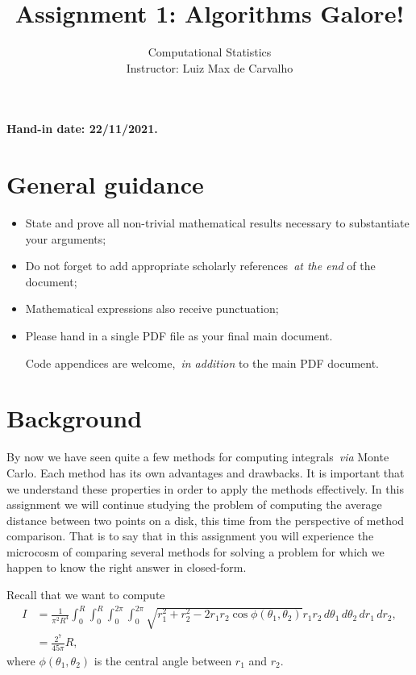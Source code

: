 \documentclass[a4paper,10pt, notitlepage]{report}
\title{Assignment 1: Algorithms Galore!}
\author{Computational Statistics \\ Instructor: Luiz Max de Carvalho}
\begin{document}
\maketitle

\textbf{Hand-in date: 22/11/2021.}

\section*{General guidance}
\begin{itemize}
 \item State and prove all non-trivial mathematical results necessary to substantiate your arguments;
 \item Do not forget to add appropriate scholarly references~\textit{at the end} of the document;
 \item Mathematical expressions also receive punctuation;
 \item Please hand in a single PDF file as your final main document.
 
 Code appendices are welcome,~\textit{in addition} to the main PDF document.
 \end{itemize}

\newpage

\section*{Background}

By now we have seen quite a few methods for computing integrals~\textit{via} Monte Carlo.
Each method has its own advantages and drawbacks.
It is important that we understand these properties in order to apply the methods effectively. 
In this assignment we will continue studying the problem of computing the average distance between two points on a disk, this time from the perspective of method comparison.
That is to say that in this assignment you will experience the microcosm of comparing several methods for solving a problem for which we happen to know the right answer in closed-form.

Recall that we want to compute 
 \begin{align*}
  I &= \frac{1}{\pi^2 R^4}\int_{0}^{R}\int_{0}^{R}\int_{0}^{2\pi}\int_{0}^{2\pi}\sqrt{r_1^2 + r_2^2 - 2r_1r_2\cos\phi(\theta_1, \theta_2)}r_1r_2\,d\theta_1\,d\theta_2\,dr_1\,dr_2,\\
  &= \frac{2^7}{45\pi}R,
 \end{align*}
 where $\phi(\theta_1, \theta_2)$ is the central angle between $r_1$ and $r_2$.
 
\end{document}
